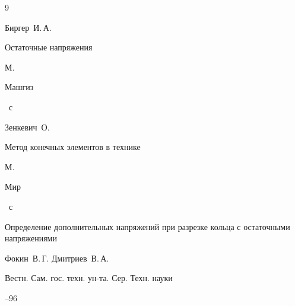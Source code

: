 \begin{thebibliography}{9}


\by Биргер~И.\,А.

\book Остаточные напряжения

\publaddr М.

\publ Машгиз


~с




\by Зенкевич~О.

\book Метод конечных элементов в технике

\publaddr М.

\publ Мир


~с




\paper Определение дополнительных напряжений при разрезке кольца с остаточными напряжениями

\by Фокин~В.\,Г. Дмитриев~В.\,А.

\jour Вестн. Сам. гос. техн. ун-та. Сер. Техн. науки



--96



\end{thebibliography}





\makeengtitlem



%

% 

